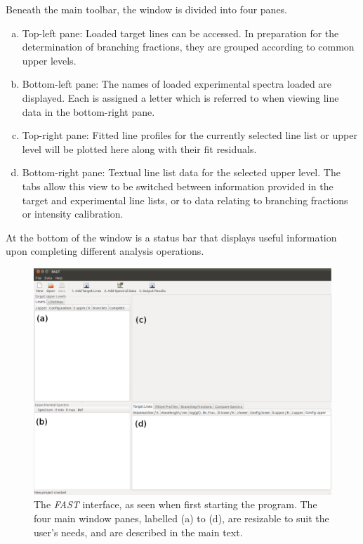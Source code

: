 \documentclass[a4paper,12pt]{report}
\newcommand{\fast}{\emph{FAST} }
\begin{document}
Beneath the main toolbar, the window is divided into four panes. 

\begin{enumerate}[(a)]
\item Top-left pane: Loaded target lines can be accessed. In preparation for the determination of branching fractions, they are grouped according to common upper levels. 
\item Bottom-left pane: The names of loaded experimental spectra loaded are displayed. Each is assigned a letter which is referred to when viewing line data in the bottom-right pane. 
\item Top-right pane: Fitted line profiles for the currently selected line list or upper level will be plotted here along with their fit residuals.
\item Bottom-right pane: Textual line list data for the selected upper level. The tabs allow this view to be switched between information provided in the target and experimental line lists, or to data relating to branching fractions or intensity calibration.
\end{enumerate}

At the bottom of the window is a status bar that displays useful information upon completing different analysis operations.

\begin{figure}
\label{fig:gui_new}
\includegraphics[width=140mm]{fast_new.eps}
\caption{The \fast interface, as seen when first starting the program. The four main window panes, labelled (a) to (d), are resizable to suit the user's needs, and are described in the main text.}
\end{figure}
\end{document}
